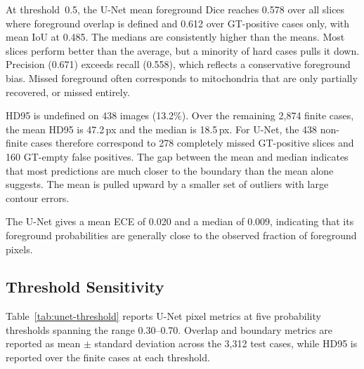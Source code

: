 \documentclass[logo,bsc,singlespacing,parskip,online]{infthesis}
\begin{document}
At threshold~0.5, the U-Net mean
foreground Dice reaches 0.578 over all slices where foreground overlap is
defined and 0.612 over GT-positive cases only, with mean IoU at 0.485. The medians are consistently
higher than the means. Most slices perform better than the average, but a
minority of hard cases pulls it down. Precision (0.671) exceeds recall (0.558),
which reflects a conservative foreground bias. Missed
foreground often corresponds to mitochondria that are only partially recovered,
or missed entirely.

HD95 is undefined on 438 images (13.2\%). Over the remaining 2,874 finite
cases, the mean HD95 is 47.2\,px and the median is 18.5\,px. For U-Net, the 438 non-finite
cases therefore correspond to 278 completely missed GT-positive slices and 160
GT-empty false positives. The gap between the mean and median indicates that
most predictions are much closer to the boundary than the mean alone suggests.
The mean is pulled upward by a smaller set of outliers with large contour
errors.

The U-Net gives a
mean ECE of 0.020 and a median of 0.009, indicating that its foreground
probabilities are generally close to the observed fraction of foreground
pixels.

\subsection{Threshold Sensitivity}
\label{sec:unet-threshold}

Table~\ref{tab:unet-threshold} reports U-Net pixel metrics at five probability
thresholds spanning the range 0.30--0.70. Overlap and boundary metrics are
reported as mean $\pm$ standard deviation across the 3,312 test cases, while
HD95 is reported over the finite cases at each threshold.
\end{document}
